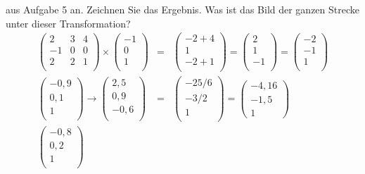 \documentclass[11pt]{article}
\begin{document}
\begin{enumerate}
aus Aufgabe 5 an. Zeichnen Sie das Ergebnis. Was ist das Bild der ganzen Strecke
unter dieser Transformation?
\begin{eqnarray*}
\begin{pmatrix}
2 & 3 &  4 \\
-1 & 0 & 0 \\
2 & 2 & 1 \\
\end{pmatrix}
\times
\begin{pmatrix}
-1 \\ 0 \\ 1 \\
\end{pmatrix}
&=&
\begin{pmatrix}
-2 + 4 \\
1 \\
-2 + 1 \\
\end{pmatrix}
=
\begin{pmatrix}
2 \\ 1 \\ -1 \\
\end{pmatrix}
=
\begin{pmatrix}
-2 \\ -1 \\ 1 \\
\end{pmatrix}
\\
\begin{pmatrix}
-0,9 \\ 0,1 \\ 1 \\
\end{pmatrix}
\rightarrow
\begin{pmatrix}
2,5 \\ 0,9 \\ -0,6 \\
\end{pmatrix}
&=&
\begin{pmatrix}
-25/6 \\ -3/2 \\ 1 \\
\end{pmatrix}
= 
\begin{pmatrix}
-4,16 \\ -1,5 \\ 1
\end{pmatrix}\\
\begin{pmatrix}
-0,8 \\ 0,2 \\ 1 \\

\end{pmatrix}
\end{eqnarray*}
\end{enumerate}
\end{document}
